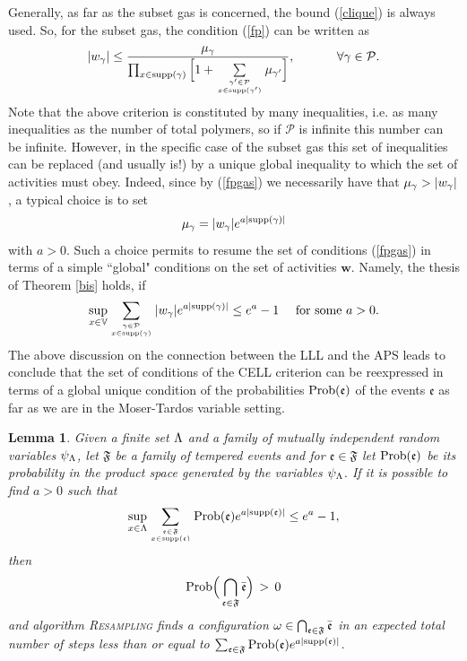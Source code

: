 \documentclass[11pt]{article}
\newtheorem{lem}[theo]{Lemma}
\let\m=\mu \let\n=\nu \let\o=\omega    \let\p=\pi \let\ph=\varphi
\let\\=\noindent
\def\ee{\end{equation}}
\def\be{\begin{equation}}
\let\m=\mu \let\n=\nu \let\o=\omega    \let\p=\pi \let\ph=\varphi
\let\\=\noindent
\def\ee{\end{equation}}
\def\be{\begin{equation}}
\def\VU{{\mathbb{V}}}\def\GI{{\mathbb{G}}}\def\0{\emptyset}\def\Z{\mathbb{Z}}
\def\obj{{\rm supp}}
\def\prob{{\rm Prob}}
\def\ev{{\mathfrak{e}}}
\def\PP{{\mathcal P}}\def\EE{{\mathcal E}}
\def\FF{{\mathfrak{F}}}
\def\0{\emptyset}
\begin{document}
\\Generally, as far as the subset gas is concerned, the bound (\ref{clique}) is always used.
So, for the subset gas,  the condition (\ref{fp}) can be  written as
\be\label{fpgas}
 |w_\g| \leq \frac{\mu_\g}{\prod_{x\in \obj(\g)}\Big[1+ \sum\limits_{\g'\in \PP\atop x\in \obj(\g')}
 \m_{\g'}\Big]},~~~~~~~~~~\forall \g\in \PP.
 \ee
 Note that the above criterion is constituted by many  inequalities, i.e. as many inequalities as the number
 of total polymers, so if $\PP$ is infinite this number can be infinite. However, in the specific case of the subset gas
 this set of inequalities can be replaced (and usually is!) by a unique global inequality to which the set of activities
 must obey. Indeed, since by (\ref{fpgas}) we necessarily have that $\m_\g> |w_\g|$, a typical choice  is to set
 $$
 \m_\g= |w_\g|e^{a|\obj(\g)|}
 $$ with $a>0$. Such a choice permits to resume
the set of conditions (\ref{fpgas}) in terms of  a simple ``global" conditions on the set
of activities $\bm w$. Namely, the thesis of Theorem \ref{bis} holds, if
\be\label{grub}
\sup_{x\in \VU}\sum_{\g\in \PP\atop x\in \obj (\g)}|w_{\g}|e^{a|\obj(\g)|}\le e^a-1 ~~~~\mbox{for some $a>0$.}
\ee
\\The above discussion on the connection between the LLL and the APS leads to conclude that
 the set of conditions of the  CELL criterion can be reexpressed in terms
of a global unique condition of the probabilities $\prob(\ev)$ of the events $\ev$ as far as we are in the Moser-Tardos variable setting.

\begin{lem}\label{global}
Given  a finite set $\Lambda$  and  a family
of mutually independent random variables $\psi_\Lambda$,
 let $\FF$ be a family of tempered events  and for $\ev\in \FF$ let
$\prob(\ev)$ be its probability in the product space generated by the variables $\psi_\Lambda$.
If it is possible to find $a>0$ such that
\be\label{grub3}
{\sup_{x\in \L}\sum_{\ev\in \FF\atop x\in \obj(\ev)}\prob(\ev)e^{a|\obj(\ev)|}}\le e^{a}-1,
\ee
then
$$
{\prob}\Big(\bigcap_{\ev\in \fa}\bar \ev\Big)\,> \,0
$$
and
algorithm \textsc{Resampling} finds a configuration $\o\in\bigcap_{\ev\in \fa}\bar \ev$ in an  expected total number of  steps less than or equal to
$\sum_{\ev\in \FF}\prob(\ev)e^{a|\obj(\ev)|}$.
 \end{lem}
\end{document}
